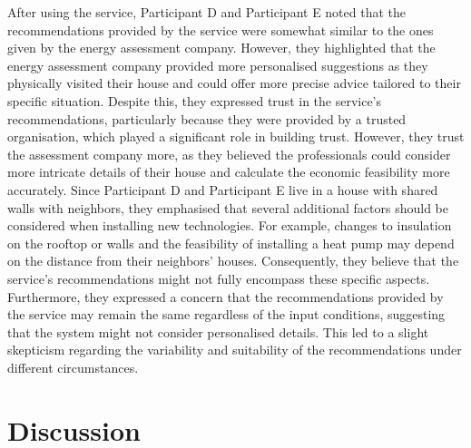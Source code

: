 After using the service, 
Participant D and Participant E noted that the recommendations provided by the service were somewhat similar to the ones given by the energy assessment company.
However, they highlighted that the energy assessment company provided more personalised suggestions as they physically visited their house and could offer more precise advice tailored to their specific situation. 
Despite this, they expressed trust in the service's recommendations, particularly because they were provided by a trusted organisation, which played a significant role in building trust.
However, they trust the assessment company more, as they believed the professionals could consider more intricate details of their house and calculate the economic feasibility more accurately. 
Since Participant D and Participant E live in a house with shared walls with neighbors, they emphasised that several additional factors should be considered when installing new technologies. 
For example, changes to insulation on the rooftop or walls and the feasibility of installing a heat pump may depend on the distance from their neighbors' houses. 
Consequently, they believe that the service's recommendations might not fully encompass these specific aspects. 
Furthermore, they expressed a concern that the recommendations provided by the service may remain the same regardless of the input conditions, suggesting that the system might not consider personalised details. 
This led to a slight skepticism regarding the variability and suitability of the recommendations under different circumstances.


\section{Discussion}